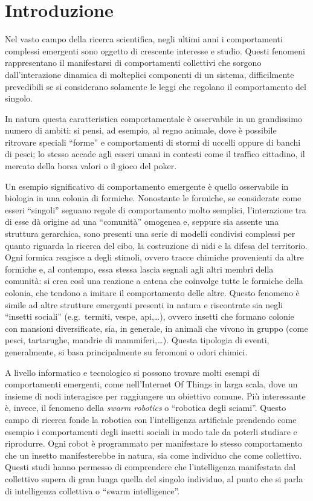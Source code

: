 \chapter{Introduzione}\label{chap:introduzione}

Nel vasto campo della ricerca scientifica, negli ultimi anni i comportamenti complessi emergenti sono oggetto di 
crescente interesse e studio. Questi fenomeni rappresentano il manifestarsi di comportamenti collettivi che sorgono
dall'interazione dinamica di molteplici componenti di un sistema, difficilmente prevedibili se si considerano solamente 
le leggi che regolano il comportamento del singolo. 

In natura questa caratteristica comportamentale è osservabile in un grandissimo numero di ambiti: si pensi, ad esempio, al regno 
animale, dove è possibile ritrovare speciali ``forme'' e comportamenti di stormi di uccelli oppure di banchi di pesci; lo stesso accade 
agli esseri umani in contesti come il traffico cittadino, il mercato della borsa valori o il gioco del poker.

Un esempio significativo di comportamento emergente è quello osservabile in biologia in una colonia di formiche. Nonostante le formiche, se considerate 
come esseri ``singoli'' seguano regole di comportamento molto semplici,
l'interazione tra di esse dà origine ad una ``comunità'' omogenea e, seppure sia assente una struttura gerarchica, sono presenti una serie di modelli condivisi
complessi per quanto riguarda la ricerca del cibo, la costruzione di nidi e la difesa del territorio.
Ogni formica reagisce a degli stimoli, ovvero tracce chimiche provenienti da altre formiche e, al contempo, essa stessa lascia segnali agli altri membri
della comunità: si crea così una reazione a catena che coinvolge tutte le formiche della colonia, che tendono a imitare il comportamento delle altre.
Questo fenomeno è simile ad altre strutture emergenti presenti in natura e riscontrate sia negli ``insetti sociali'' (e.g.\ termiti, vespe, api,\dots),
ovvero insetti che formano colonie con mansioni diversificate, sia, in generale, in animali che vivono in gruppo 
(come pesci, tartarughe, mandrie di mammiferi,\ldots). Questa tipologia di eventi, generalmente, si basa principalmente su feromoni o odori chimici.

A livello informatico e tecnologico si possono trovare molti esempi di comportamenti emergenti, come nell'Internet Of Things in larga scala, dove un insieme di nodi
interagisce per raggiungere un obiettivo comune. 
Più interessante è, invece, il fenomeno della \textit{swarm robotics} o ``robotica degli sciami''. Questo campo di ricerca fonde la robotica con l'intelligenza artificiale 
prendendo come esempio i comportamenti degli insetti sociali in modo tale da poterli studiare e riprodurre. Ogni robot è programmato per manifestare lo stesso comportamento 
che un insetto manifesterebbe in natura, sia come individuo che come collettivo. Questi studi hanno permesso di comprendere che
l'intelligenza manifestata dal collettivo supera di gran lunga quella del singolo individuo, al punto che si parla di intelligenza collettiva o ``swarm intelligence''.

